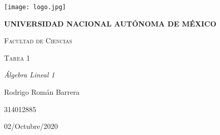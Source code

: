 \documentclass{report}
\begin{document}
\begin{titlepage}
\centering
{\texttt{[image: logo.jpg]}\par}
\vspace{1cm}
{\bfseries\Large UNIVERSIDAD NACIONAL AUTÓNOMA DE MÉXICO \par}
\vspace{.5cm}
{\scshape\Large Facultad de Ciencias \par}
\vspace{2cm}
{\scshape\Huge Tarea 1 \par}
\vspace{3cm}
{\itshape\Large Álgebra Lineal 1 \par}
\vfill
{\Large Rodrigo Román Barrera \par}
{\Large 314012885 \par}
\vfill
{\Large 02/Octubre/2020 \par}
\end{titlepage}
\newpage
\end{document}

